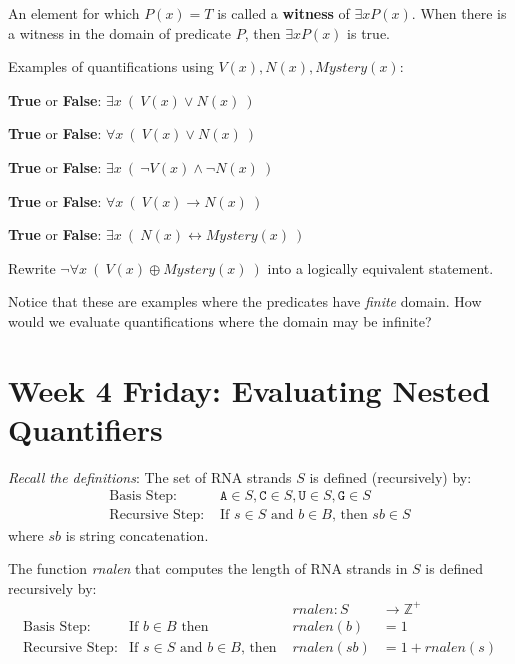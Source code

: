 \documentclass[12pt, oneside]{article}
\newcommand{\A}[0]{\texttt{A}}
\newcommand{\C}[0]{\texttt{C}}
\newcommand{\G}[0]{\texttt{G}}
\newcommand{\U}[0]{\texttt{U}}
\begin{document}
An element for which $P(x) = T$ is called a {\bf witness} of $\exists x P(x)$. When there is a witness in the domain of predicate $P$, then $\exists x P(x)$ is true.
 \vfill


Examples of quantifications using $V(x), N(x), Mystery(x)$:



{\bf True} or {\bf False}: $\exists x~ (~V(x) \lor N(x)~)$

\vfill


{\bf True} or {\bf False}: $\forall x~ (~V(x) \lor N(x)~)$

\vfill


{\bf True} or {\bf False}: $\exists x~ (~\lnot V(x) \land \lnot N(x)~)$

\vfill

{\bf True} or {\bf False}: $\forall x~ (~V(x) \to N(x)~)$

\vfill

{\bf True} or {\bf False}: $\exists x~ (~N(x) \leftrightarrow Mystery(x)~)$

\vfill

Rewrite $\lnot \forall x~(~V(x) \oplus Mystery(x)~)$ into a logically equivalent statement.

\vspace{50pt}


Notice that these are examples where the predicates have {\it finite} domain.
How would we evaluate quantifications where the domain may be infinite?

\vfill

 \vfill
\newpage

\section*{Week 4 Friday: Evaluating Nested Quantifiers}


{\it Recall the definitions}: The set of RNA strands $S$ is defined (recursively) by:
\[
\begin{array}{ll}
\textrm{Basis Step: } & \A \in S, \C \in S, \U \in S, \G \in S \\
\textrm{Recursive Step: } & \textrm{If } s \in S\textrm{ and }b \in B \textrm{, then }sb \in S
\end{array}
\]
where $sb$ is string concatenation.

The function \textit{rnalen} that computes the length of RNA strands in $S$ is defined recursively by:
\[
\begin{array}{llll}
& & \textit{rnalen} : S & \to \mathbb{Z}^+ \\
\textrm{Basis Step:} & \textrm{If } b \in B\textrm{ then } & \textit{rnalen}(b) & = 1 \\
\textrm{Recursive Step:} & \textrm{If } s \in S\textrm{ and }b \in B\textrm{, then  } & \textit{rnalen}(sb) & = 1 + \textit{rnalen}(s)
\end{array}
\]
\end{document}
